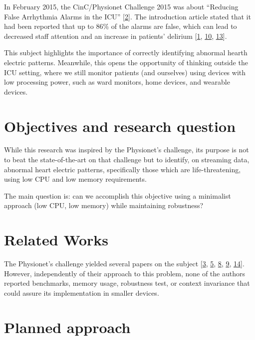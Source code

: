 \documentclass[runningheads]{llncs}
\begin{document}
In February 2015, the CinC/Physionet Challenge 2015 was about ``Reducing False Arrhythmia Alarms in
the ICU'' {[}\protect\hyperlink{ref-Clifford2015}{2}{]}. The introduction article stated that it had been reported that up to 86\%
of the alarms are false, which can lead to decreased staff attention and an increase in patients'
delirium {[}\protect\hyperlink{ref-Chambrin2001}{1}, \protect\hyperlink{ref-Lawless1994}{10}, \protect\hyperlink{ref-Parthasarathy2004}{13}{]}.

This subject highlights the importance of correctly identifying abnormal hearth electric patterns.
Meanwhile, this opens the opportunity of thinking outside the ICU setting, where we still monitor
patients (and ourselves) using devices with low processing power, such as ward monitors, home
devices, and wearable devices.

\hypertarget{objectives-and-research-question}{%
\section{Objectives and research question}\label{objectives-and-research-question}}

While this research was inspired by the Physionet's challenge, its purpose is not to beat the
state-of-the-art on that challenge but to identify, on streaming data, abnormal heart electric
patterns, specifically those which are life-threatening, using low CPU and low memory requirements.

The main question is: can we accomplish this objective using a minimalist approach (low CPU, low
memory) while maintaining robustness?

\hypertarget{related-works}{%
\section{Related Works}\label{related-works}}

The Physionet's challenge yielded several papers on the subject
{[}\protect\hyperlink{ref-couto2015}{3}, \protect\hyperlink{ref-fallet2015}{5}, \protect\hyperlink{ref-hoogantink2015}{8}, \protect\hyperlink{ref-kalidas2015}{9}, \protect\hyperlink{ref-plesinger2015}{14}{]}. However, independently of
their approach to this problem, none of the authors reported benchmarks, memory usage, robustness
test, or context invariance that could assure its implementation in smaller devices.

\hypertarget{planned-approach}{%
\section{Planned approach}\label{planned-approach}}
\end{document}
